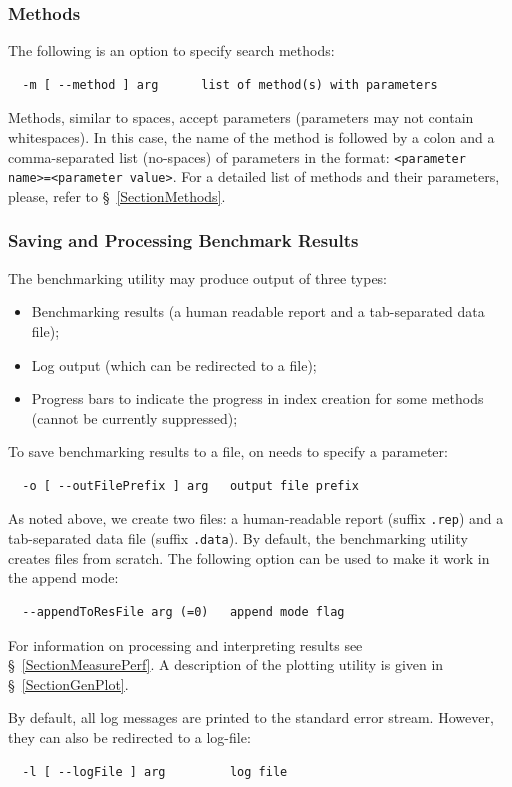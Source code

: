 \documentclass[runningheads,a4paper]{llncs}
\newcommand{\ttt}[1]{\texttt{#1}}
\begin{document}
{\subsubsection{Methods}
The following is an option to specify search methods:
\begin{verbatim}
  -m [ --method ] arg      list of method(s) with parameters
\end{verbatim}
Methods, similar to spaces, accept parameters (parameters may not contain whitespaces). 
In this case,
the name of the method is followed by a colon and a comma-separated list (no-spaces)
of parameters in the format:
\ttt{<parameter name>=<parameter value>}.
For a detailed list of methods and their parameters, please, refer to \S~\ref{SectionMethods}.


\subsubsection{Saving and Processing Benchmark Results}
The benchmarking utility may produce output of three types:
\begin{itemize}
\item Benchmarking results (a human readable report and a tab-separated data file);
\item Log output (which can be redirected to a file);
\item Progress bars to indicate the progress in index creation for some methods (cannot be currently suppressed);
\end{itemize}

To save benchmarking results to a file, on needs to specify a parameter:
\begin{verbatim}
  -o [ --outFilePrefix ] arg   output file prefix
\end{verbatim}
As noted above, we create two files: a human-readable report (suffix \ttt{.rep}) and 
a tab-separated data file (suffix \ttt{.data}).
By default, the benchmarking utility creates files from scratch. The
following option can be used to make it work in the append mode:
\begin{verbatim}
  --appendToResFile arg (=0)   append mode flag
\end{verbatim}
For information on processing and interpreting results see \S~\ref{SectionMeasurePerf}.
A description of the plotting utility is given in \S~\ref{SectionGenPlot}.

By default, all log messages are printed to the standard error stream.
However, they can also be redirected to a log-file:
\begin{verbatim}
  -l [ --logFile ] arg         log file
\end{verbatim}

}
\end{document}
